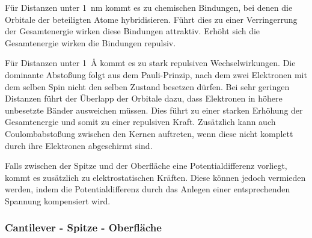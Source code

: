           Für Distanzen unter \SI{1}{\nano\metre} kommt es zu chemischen Bindungen, bei denen die Orbitale der beteiligten Atome hybridisieren. Führt dies zu einer Verringerrung der Gesamtenergie wirken diese 
          Bindungen attraktiv. Erhöht sich die Gesamtenergie wirken die Bindungen repulsiv.

          Für Distanzen unter \SI{1}{\angstrom} kommt es zu stark repulsiven Wechselwirkungen. Die dominante Abstoßung folgt aus dem Pauli-Prinzip, nach dem zwei Elektronen mit dem selben Spin nicht den selben 
          Zustand besetzen dürfen. Bei sehr geringen Distanzen führt der Überlapp der Orbitale dazu, dass Elektronen in höhere unbesetzte Bänder ausweichen müssen. Dies führt zu einer starken Erhöhung der 
          Gesamtenergie und somit zu einer repulsiven Kraft. Zusätzlich kann auch Coulombabstoßung zwischen den Kernen auftreten, wenn diese nicht komplett durch ihre Elektronen abgeschirmt sind.

          Falls zwischen der Spitze und der Oberfläche eine Potentialdifferenz vorliegt, kommt es zusätzlich zu elektrostatischen Kräften. Diese können jedoch vermieden werden, indem die Potentialdifferenz durch
          das Anlegen einer entsprechenden Spannung kompensiert wird.\newline

        
        \subsubsection{Cantilever - Spitze - Oberfläche}

          \FloatBarrier

